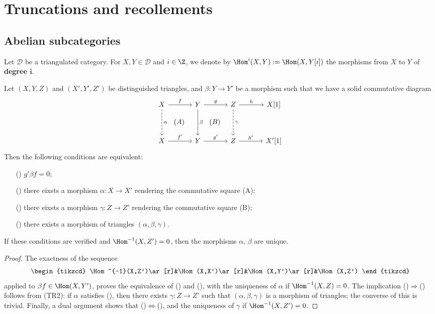 \section{Truncations and recollements}
\subsection{Abelian subcategories}
Let $\mathcal{D}$ be a triangulated category. For $X,Y\in\mathcal{D}$ and $i\in\Z$, we denote by $\Hom^i(X,Y):=\Hom(X,Y[i])$ the morphisms from $X$ to $Y$ of \textbf{degree $\bm{i}$}.
\begin{proposition}\label{triangle cat morphism extension to triangle iff}
Let $(X,Y,Z)$ and $(X',Y',Z')$ be distinguished triangles, and $\beta:Y\to Y'$ be a morphism such that we have a solid commutative diagram
\[\begin{tikzcd}[row sep=12mm,column sep=12mm]
X\ar[r,"f"]\ar[rd,phantom,font=\small,"(A)"]\ar[d,dashed,"\alpha"]&Y\ar[r,"g"]\ar[d,"\beta"]\ar[rd,phantom,"(B)"]&Z\ar[r,"h"]\ar[d,dashed,"\gamma"]&X[1]\\
X\ar[r,"f'"]&Y\ar[r,"g'"]&Z\ar[r,"h'"]&X'[1]
\end{tikzcd}\]
Then the following conditions are equivalent:
\begin{enumerate}
    \item[(\rmnum{1})] $g'\beta f=0$;
    \item[(\rmnum{2})] there eixsts a morphism $\alpha:X\to X'$ rendering the commutative square (A);
    \item[(\rmnum{3})] there eixsts a morphism $\gamma:Z\to Z'$ rendering the commutative square (B);
    \item[(\rmnum{4})] there exists a morphism of triangles $(\alpha,\beta,\gamma)$. 
\end{enumerate}
If these conditions are verified and $\Hom^{-1}(X,Z')=0$, then the morphisms $\alpha$, $\beta$ are unique.
\end{proposition}
\begin{proof}
The exactness of the sequence
\[\begin{tikzcd}
\Hom^{-1}(X,Z')\ar[r]&\Hom(X,X')\ar[r]&\Hom(X,Y')\ar[r]&\Hom(X,Z')
\end{tikzcd}\]
applied to $\beta f\in\Hom(X,Y')$, proves the equivalence of () and (), with the uniqueness of $\alpha$ if $\Hom^{-1}(X,Z)=0$. The implication ()$\Rightarrow$() follows from (TR2): if $\alpha$ satisfies (), then there exists $\gamma:Z\to Z'$ such that $(\alpha,\beta,\gamma)$ is a morphism of triangles; the converse of this is trivial. Finally, a dual argument shows that ()$\Leftrightarrow$(), and the uniqueness of $\gamma$ if $\Hom^{-1}(X,Z')=0$.
\end{proof}

